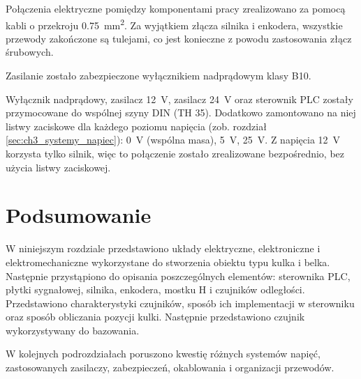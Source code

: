 
Połączenia elektryczne pomiędzy komponentami pracy zrealizowano za pomocą kabli o przekroju \SI{0,75}{\milli\meter\squared}. Za wyjątkiem złącza silnika i enkodera, wszystkie przewody zakończone są tulejami, co jest konieczne z powodu zastosowania złącz śrubowych.

Zasilanie zostało zabezpieczone wyłącznikiem nadprądowym klasy B10.

Wyłącznik nadprądowy, zasilacz \SI{12}{\volt}, zasilacz \SI{24}{\volt} oraz sterownik PLC zostały przymocowane do wspólnej szyny DIN (TH \num{35}). Dodatkowo zamontowano na niej listwy zaciskowe dla każdego poziomu napięcia (zob. rozdział \ref{sec:ch3_systemy_napiec}): \SI{0}{\volt} (wspólna masa), \SI{5}{\volt}, \SI{25}{\volt}. Z napięcia \SI{12}{\volt} korzysta tylko silnik, więc to połączenie zostało zrealizowane bezpośrednio, bez użycia listwy zaciskowej.

\section{Podsumowanie}

W niniejszym rozdziale przedstawiono układy elektryczne, elektroniczne i elektromechaniczne wykorzystane do stworzenia obiektu typu kulka i belka. Następnie przystąpiono do opisania poszczególnych elementów: sterownika PLC, płytki sygnałowej, silnika, enkodera, mostku H i czujników odległości. Przedstawiono charakterystyki czujników, sposób ich implementacji w sterowniku oraz sposób obliczania pozycji kulki. Następnie przedstawiono czujnik wykorzystywany do bazowania.

W kolejnych podrozdziałach poruszono kwestię różnych systemów napięć, zastosowanych zasilaczy, zabezpieczeń, okablowania i organizacji przewodów.


